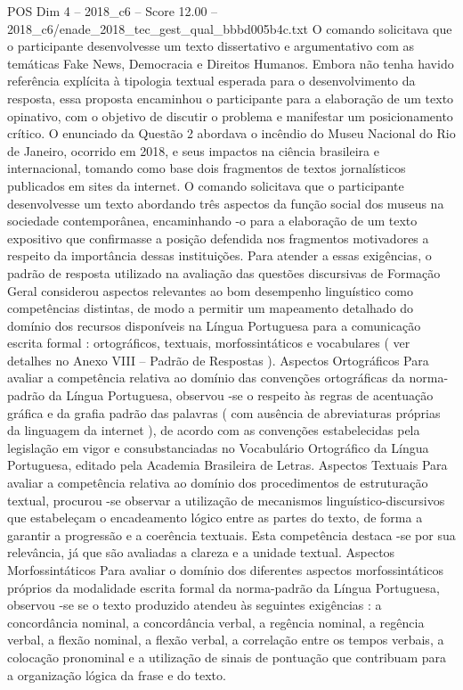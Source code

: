 \begin{textsample}{POS Dim 4 – 2018\_c6 – Score 12.00 – 2018\_c6/enade\_2018\_tec\_gest\_qual\_bbbd005b4c.txt}
O comando solicitava que o participante desenvolvesse um texto dissertativo e argumentativo com as temáticas Fake News, Democracia e Direitos Humanos.
Embora não tenha havido referência explícita à tipologia textual esperada para o desenvolvimento da resposta, essa proposta encaminhou o participante para a elaboração de um texto opinativo, com o objetivo de discutir o problema e manifestar um posicionamento crítico.
O enunciado da Questão 2 abordava o incêndio do Museu Nacional do Rio de Janeiro, ocorrido em 2018, e seus impactos na ciência brasileira e internacional, tomando como base dois fragmentos de textos jornalísticos publicados em sites da internet.
O comando solicitava que o participante desenvolvesse um texto abordando três aspectos da função social dos museus na sociedade contemporânea, encaminhando -o para a elaboração de um texto expositivo que confirmasse a posição defendida nos fragmentos motivadores a respeito da importância dessas instituições.
Para atender a essas exigências, o padrão de resposta utilizado na avaliação das questões discursivas de Formação Geral considerou aspectos relevantes ao bom desempenho linguístico como competências distintas, de modo a permitir um mapeamento detalhado do domínio dos recursos disponíveis na Língua Portuguesa para a comunicação escrita formal : ortográficos, textuais, morfossintáticos e vocabulares ( ver detalhes no Anexo VIII – Padrão de Respostas ).
Aspectos Ortográficos Para avaliar a competência relativa ao domínio das convenções ortográficas da norma-padrão da Língua Portuguesa, observou -se o respeito às regras de acentuação gráfica e da grafia padrão das palavras ( com ausência de abreviaturas próprias da linguagem da internet ), de acordo com as convenções estabelecidas pela legislação em vigor e consubstanciadas no Vocabulário Ortográfico da Língua Portuguesa, editado pela Academia Brasileira de Letras.
Aspectos Textuais Para avaliar a competência relativa ao domínio dos procedimentos de estruturação textual, procurou -se observar a utilização de mecanismos linguístico-discursivos que estabeleçam o encadeamento lógico entre as partes do texto, de forma a garantir a progressão e a coerência textuais.
Esta competência destaca -se por sua relevância, já que são avaliadas a clareza e a unidade textual.
Aspectos Morfossintáticos Para avaliar o domínio dos diferentes aspectos morfossintáticos próprios da modalidade escrita formal da norma-padrão da Língua Portuguesa, observou -se se o texto produzido atendeu às seguintes exigências : a concordância nominal, a concordância verbal, a regência nominal, a regência verbal, a flexão nominal, a flexão verbal, a correlação entre os tempos verbais, a colocação pronominal e a utilização de sinais de pontuação que contribuam para a organização lógica da frase e do texto.

\end{textsample}
